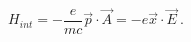 \begin{equation}\label{ct99-2}
H_{int}=-\frac{e}{mc}\vec{p}\cdot \vec{A}=-e\vec{x}\cdot \vec{E}~.
\end{equation}

